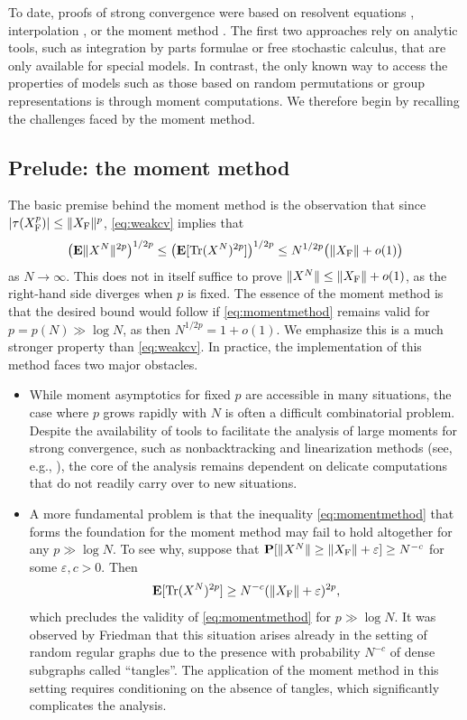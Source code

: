 \documentclass[10pt,reqno]{amsart}
\theoremstyle{definition}
\theoremstyle{remark}
\numberwithin{equation}{section}
\numberwithin{figure}{section}
\numberwithin{table}{section}
\newcommand{\tr}{\mathop{\mathrm{Tr}}}
\newcommand{\EE}{\mathbf{E}}
\begin{document}
To date, proofs of strong convergence were based on resolvent 
equations \cite{HT05,Sch05}, interpolation \cite{CGP22,Par22,Par23,BBV23}, 
or the moment method \cite{BC19,BC20,BC24}. The first two approaches rely 
on analytic tools, such as integration by parts formulae or free 
stochastic calculus, that are only available for special models. In 
contrast, the only known way to access the properties of models such as 
those based on random permutations or group representations is through 
moment computations. We therefore begin by 
recalling the challenges faced by the moment method.


\subsection{Prelude: the moment method}
\label{sec:prelude}

The basic premise behind the moment method is the observation that since
$|\tau(X_{\rm F}^p)|\le \|X_{\rm F}\|^p$, 
\eqref{eq:weakcv} implies that
\begin{equation}
\label{eq:momentmethod}
	\big(\EE\|X^N\|^{2p}\big)^{1/2p} \le
	\big(\EE[\tr (X^N)^{2p}]\big)^{1/2p} \le
	N^{1/2p} \big(\|X_{\rm F}\|+o(1)\big)
\end{equation}
as $N\to\infty$. This does not in itself suffice to prove $\|X^N\|\le 
\|X_{\rm F}\|+o(1)$, as the right-hand side diverges when $p$ is fixed. 
The essence of the moment method is that the desired bound would follow if 
\eqref{eq:momentmethod} remains valid for $p=p(N)\gg\log N$, as then
$N^{1/2p} = 1+o(1)$. We emphasize this is a much stronger property 
than \eqref{eq:weakcv}.
In practice, the implementation of this method faces two major 
obstacles.\vspace*{.5mm}
\begin{itemize}[leftmargin=*]
\addtolength{\itemsep}{.2cm}
\item While moment asymptotics for fixed $p$ are 
accessible in many situations, the case where $p$ grows rapidly with $N$ 
is often a difficult combinatorial problem. Despite the availability of
tools to facilitate the analysis of large moments for
strong convergence, such as nonbacktracking and linearization
methods (see, e.g., \cite{BC19,BC24}), the core of the analysis remains 
dependent on delicate computations that do not
readily carry over to new situations.
%
\item A more fundamental problem is that the inequality \eqref{eq:momentmethod}
that forms the foundation for the moment method may fail to hold 
altogether for any $p\gg\log N$. To see why, suppose that
$\mathbf{P}[\|X^N\|\ge \|X_{\rm F}\|+\varepsilon]\ge N^{-c}$ for
some $\varepsilon,c>0$. Then 
$$
	\EE[\tr (X^N)^{2p}] \ge N^{-c} (\|X_{\rm F}\|+\varepsilon)^{2p},
$$
which precludes the validity of \eqref{eq:momentmethod} for $p\gg\log N$.
It was observed by Friedman \cite{Fri08} that this situation arises
already in the setting of random regular graphs due to the presence
with probability $N^{-c}$ of dense subgraphs called ``tangles''.
The application of the moment method in this setting requires
conditioning on the absence of tangles, which significantly complicates 
the analysis.
\end{itemize}
\end{document}
